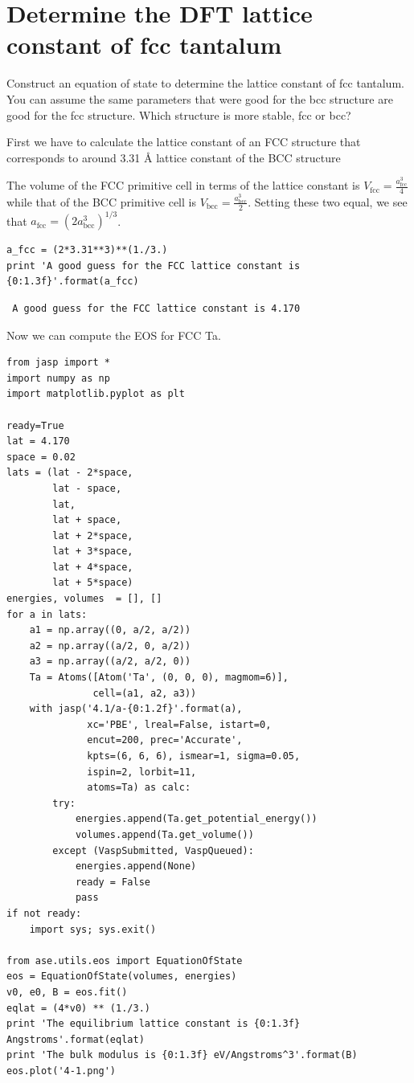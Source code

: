 \documentclass[11pt]{article}
\begin{document}
\section{Determine the DFT lattice constant of fcc tantalum}
\label{sec-4}

Construct an equation of state to determine the lattice constant of fcc tantalum. You can assume the same parameters that were good for the bcc structure are good for the fcc structure. Which structure is more stable, fcc or bcc?
\bigskipt

First we have to calculate the lattice constant of an FCC structure that corresponds to around 3.31 \AA{} lattice constant of the BCC structure

The volume of the FCC primitive cell in terms of the lattice constant is $V_{\mathrm{fcc}} = \frac{a_{\mathrm{fcc}}^3}{4}$ while that of the BCC primitive cell is $V_{\mathrm{bcc}} = \frac{a_{\mathrm{bcc}}^3}{2}$. Setting these two equal, we see that $a_{\mathrm{fcc}} = (2a_{\mathrm{bcc}}^{3})^{1/3}$. 


\begin{verbatim}
a_fcc = (2*3.31**3)**(1./3.)
print 'A good guess for the FCC lattice constant is {0:1.3f}'.format(a_fcc)
\end{verbatim}

\begin{verbatim}
 A good guess for the FCC lattice constant is 4.170
\end{verbatim}

Now we can compute the EOS for FCC Ta.


\begin{verbatim}
from jasp import *
import numpy as np
import matplotlib.pyplot as plt

ready=True
lat = 4.170
space = 0.02
lats = (lat - 2*space,
        lat - space,
        lat,
        lat + space,
        lat + 2*space,
        lat + 3*space,
        lat + 4*space,
        lat + 5*space)
energies, volumes  = [], []
for a in lats:
    a1 = np.array((0, a/2, a/2))
    a2 = np.array((a/2, 0, a/2))
    a3 = np.array((a/2, a/2, 0))
    Ta = Atoms([Atom('Ta', (0, 0, 0), magmom=6)],
               cell=(a1, a2, a3))
    with jasp('4.1/a-{0:1.2f}'.format(a),
              xc='PBE', lreal=False, istart=0,
              encut=200, prec='Accurate',
              kpts=(6, 6, 6), ismear=1, sigma=0.05,
              ispin=2, lorbit=11,
              atoms=Ta) as calc:
        try:
            energies.append(Ta.get_potential_energy())
            volumes.append(Ta.get_volume())
        except (VaspSubmitted, VaspQueued):
            energies.append(None)
            ready = False
            pass
if not ready:
    import sys; sys.exit()

from ase.utils.eos import EquationOfState
eos = EquationOfState(volumes, energies)
v0, e0, B = eos.fit()
eqlat = (4*v0) ** (1./3.)
print 'The equilibrium lattice constant is {0:1.3f} Angstroms'.format(eqlat)
print 'The bulk modulus is {0:1.3f} eV/Angstroms^3'.format(B)
eos.plot('4-1.png')
\end{verbatim}
\end{document}
